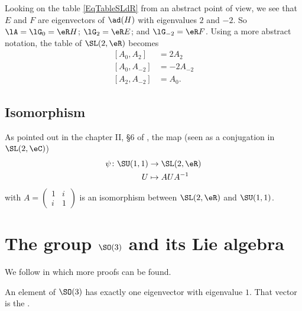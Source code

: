 Looking on the table \eqref{EqTableSLdR} from an abstract point of view, we see that $E$ and $F$ are eigenvectors of $\ad(H)$ with eigenvalues $2$ and $-2$. So $\lA=\lG_0=\eR H$; $\lG_2=\eR E$; and $\lG_{-2}=\eR F$. Using a more abstract notation, the table of $\SL(2,\eR)$ becomes
\begin{subequations}  \label{subeq_rootSLR}
\begin{align}
  [A_{0},A_{2}]&=2A_{2}\\
    [A_{0},A_{-2}]&=-2A_{-2}\\
    [A_{2},A_{-2}]&=A_{0}.
\end{align}
\end{subequations}

\subsection{Isomorphism}

As pointed out in the chapter II, \S6 of \cite{Knapp_reprez}, the map (seen as a conjugation in $\SL(2,\eC)$)
\begin{equation}
    \begin{aligned}
        \psi\colon \SU(1,1)&\to \SL(2,\eR) \\ 
        U&\mapsto AUA^{-1} 
    \end{aligned}
\end{equation}
with $A=\begin{pmatrix}
1&i\\i&1
\end{pmatrix}$ is an isomorphism between $\SL(2,\eR)$ and $\SU(1,1)$.

                    \section{The group \texorpdfstring{$\SO(3)$}{SO3} and its Lie algebra}
\label{SubSecTheGroupSotrois}

We follow \cite{WormerAngular} in which more proofs can be found.

\begin{proposition}
An element of $\SO(3)$ has exactly one eigenvector with eigenvalue $1$. That vector is the .
\end{proposition}

